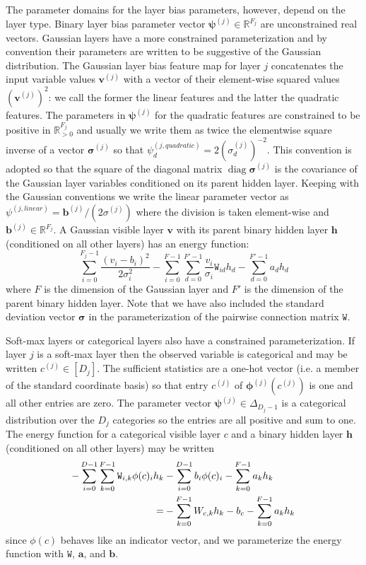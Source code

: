 \documentclass{article} %
\newcommand{\diag}{\mathop{\mathrm{diag}}}
\begin{document}
The parameter domains for the
layer bias parameters, however, depend on the layer type.  Binary layer bias parameter vector $\boldsymbol{\psi}^{(j)}\in\mathbb{R}^{F_j}$
are unconstrained real vectors.  Gaussian layers have a more constrained parameterization and by convention their parameters
are written to be suggestive of the Gaussian distribution.  The Gaussian layer bias feature map for layer $j$ 
concatenates the input variable values
$\mathbf{v}^{(j)}$ with a vector of their element-wise squared values $(\mathbf{v}^{(j)})^2$: we call the former the linear features
and the latter the quadratic features.  The parameters in $\boldsymbol{\psi}^{(j)}$ for the quadratic features are constrained to be positive
in $\mathbb{R}^{F_j}_{>0}$ and usually we write them as twice the elementwise square inverse of a vector $\boldsymbol{\sigma}^{(j)}$ so that
$\psi^{(j,quadratic)}_d = 2(\sigma^{(j)}_d)^{-2}$. This convention is adopted so that the square of the diagonal matrix $\diag\boldsymbol{\sigma}^{(j)}$ is the covariance of the Gaussian layer variables conditioned on its parent hidden layer. Keeping with the Gaussian conventions we write
the linear parameter vector as $\psi^{(j,linear)} = \mathbf{b}^{(j)}/(2\sigma^{(j)})$ where the division is taken element-wise and $\mathbf{b}^{(j)}\in\mathbb{R}^{F_j}$.  A Gaussian visible layer $\mathbf{v}$ with its parent binary hidden layer $\mathbf{h}$ (conditioned on all other layers) has
an energy function:
\begin{equation}
  \sum_{i=0}^{F_j-1} \frac{(v_i - b_i)^2}{2\sigma_i^2} - \sum_{i=0}^{F-1}\sum_{d=0}^{F'-1} \frac{v_i}{\sigma_i}\mathtt{W}_{id}h_d - \sum_{d=0}^{F'-1} a_d h_d
\end{equation}
where $F$ is the dimension of the Gaussian layer and $F'$ is the dimension of the parent binary hidden layer. Note that we have also included
the standard deviation vector $\boldsymbol{\sigma}$ in the parameterization of the pairwise connection matrix $\mathtt{W}$.

Soft-max layers or categorical layers also have a constrained parameterization.  If layer $j$ is a soft-max layer then the observed variable
is categorical and may be written $c^{(j)}\in [D_j]$.  The sufficient statistics are a one-hot vector (i.e. a member of the standard coordinate
basis) so that entry $c^{(j)}$ of $\boldsymbol{\phi}^{(j)}(c^{(j)})$ is one and all other entries are zero.  The parameter vector $\boldsymbol{\psi}^{(j)}\in \Delta_{D_j-1}$ is a categorical distribution over the $D_j$ categories so the entries are all positive and sum to one.  The energy
function for a categorical visible layer $c$ and a binary hidden layer $\mathbf{h}$ (conditioned on all other layers) may be written
\begin{align}
- \sum_{i=0}^{D-1}\sum_{k=0}^{F-1}\mathtt{W}_{i,k} \phi(c)_i h_k& - \sum_{i=0}^{D-1} b_i \phi(c)_i  - \sum_{k=0}^{F-1} a_k h_k \notag\\
=& - \sum_{k=0}^{F-1} W_{c,k}h_k - b_c - \sum_{k=0}^{F-1} a_k h_k
\end{align}
since $\phi(c)$ behaves like an indicator vector, and we parameterize the energy function with $\mathtt{W}$, $\mathbf{a}$, and $\mathbf{b}$.
\end{document}
